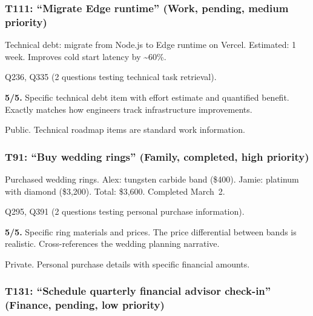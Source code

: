 \subsubsection*{T111: ``Migrate Edge runtime'' (Work, pending, medium priority)}

\begin{description}[nosep,leftmargin=1.5cm]
    \item[Description:] Technical debt: migrate from Node.js to Edge runtime on Vercel. Estimated: 1 week. Improves cold start latency by \textasciitilde60\%.
    \item[Referenced by:] Q236, Q335 (2 questions testing technical task retrieval).
    \item[Realism:] \textbf{5/5.} Specific technical debt item with effort estimate and quantified benefit. Exactly matches how engineers track infrastructure improvements.
    \item[Privacy:] Public. Technical roadmap items are standard work information.
\end{description}

\subsubsection*{T91: ``Buy wedding rings'' (Family, completed, high priority)}

\begin{description}[nosep,leftmargin=1.5cm]
    \item[Description:] Purchased wedding rings. Alex: tungsten carbide band (\$400). Jamie: platinum with diamond (\$3,200). Total: \$3,600. Completed March~2.
    \item[Referenced by:] Q295, Q391 (2 questions testing personal purchase information).
    \item[Realism:] \textbf{5/5.} Specific ring materials and prices. The price differential between bands is realistic. Cross-references the wedding planning narrative.
    \item[Privacy:] Private. Personal purchase details with specific financial amounts.
\end{description}

\subsubsection*{T131: ``Schedule quarterly financial advisor check-in'' (Finance, pending, low priority)}

